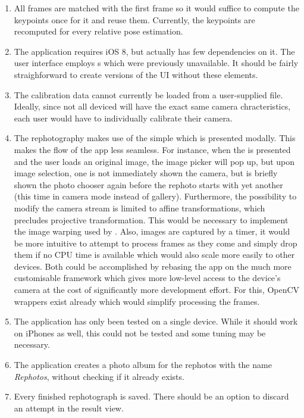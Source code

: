 \begin{enumerate}
   \item All frames are matched with the first frame so it would suffice to
      compute the keypoints once for it and reuse them. Currently, the keypoints
      are recomputed for every relative pose estimation.

   \item The application requires iOS 8, but actually has few dependencies on
      it. The user interface employs s which were
      previously unavailable. It should be fairly straighforward to create
      versions of the UI without these elements.

   \item The calibration data cannot currently be loaded from a user-supplied
      file. Ideally, since not all deviced will have the exact same camera
      chracteristics, each user would have to individually calibrate their
      camera.

   \item The rephotography makes use of the simple
       which is presented modally. This makes the
      flow of the app less seamless. For instance, when the
       is presented and the user loads an original image,
      the image picker will pop up, but upon image selection, one is not
      immediately shown the camera, but is briefly shown the photo chooser again
      before the rephoto starts with yet another 
      (this time in camera mode instead of gallery).
      Furthermore, the possibility to modify the camera stream is limited to
      affine transformations, which precludes projective transformation. This
      would be necessary to implement the image warping used by \citet{bae2010}.
      Also, images are captured by a timer, it would be more intuitive to
      attempt to process frames as they come and simply drop them if no CPU time
      is available which would also scale more easily to other devices. Both
      could be accomplished by rebasing the app on the much more customisable
       framework which gives more low-level access to the device's
      camera at the cost of significantly more development effort.
      For this, OpenCV wrappers exist already which would simplify processing the frames.  

   \item The application has only been tested on a single device. While it
      should work on iPhones as well, this could not be tested and some tuning
      may be necessary.

   \item The application creates a photo album for the rephotos with the name
      \emph{Rephotos}, without checking if it already exists.

   \item Every finished rephotograph is saved. There should be an option to
      discard an attempt in the result view.

\end{enumerate}


